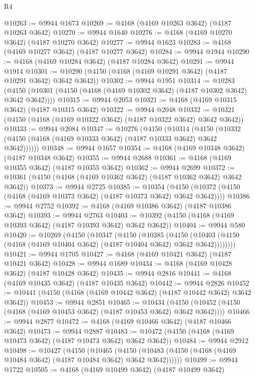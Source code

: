 \begin{lexlean}{R4}
\begin{coremodule}
@10263 := @9944 @1673
@10269 := @4168 (@4169 @10263 @3642) (@4187 @10263 @3642)
@10270 := @9944 @1640
@10276 := @4168 (@4169 @10270 @3642) (@4187 @10270 @3642)
@10277 := @9944 @1623
@10283 := @4168 (@4169 @10277 @3642) (@4187 @10277 @3642)
@10284 := @9944 @1944
@10290 := @4168 (@4169 @10284 @3642) (@4187 @10284 @3642)
@10291 := @9944 @1914
@10301 := @10290 (@4150 (@4168 (@4169 @10291 @3642) (@4187 @10291 @3642) @3642 @3642))
@10302 := @9944 @1951
@10314 := @10283
    (@4150 (@10301 (@4150 (@4168 (@4169 @10302 @3642) (@4187 @10302 @3642) @3642 @3642))))
@10315 := @9944 @2053
@10321 := @4168 (@4169 @10315 @3642) (@4187 @10315 @3642)
@10322 := @9944 @2048
@10332 := @10321 (@4150 (@4168 (@4169 @10322 @3642) (@4187 @10322 @3642) @3642 @3642))
@10333 := @9944 @2084
@10347 := @10276
    (@4150
      (@10314
        (@4150 (@10332 (@4150 (@4168 (@4169 @10333 @3642) (@4187 @10333 @3642) @3642 @3642))))))
@10348 := @9944 @1657
@10354 := @4168 (@4169 @10348 @3642) (@4187 @10348 @3642)
@10355 := @9944 @2688
@10361 := @4168 (@4169 @10355 @3642) (@4187 @10355 @3642)
@10362 := @9944 @2699
@10372 := @10361 (@4150 (@4168 (@4169 @10362 @3642) (@4187 @10362 @3642) @3642 @3642))
@10373 := @9944 @2725
@10385 := @10354
    (@4150 (@10372 (@4150 (@4168 (@4169 @10373 @3642) (@4187 @10373 @3642) @3642 @3642))))
@10386 := @9944 @2752
@10392 := @4168 (@4169 @10386 @3642) (@4187 @10386 @3642)
@10393 := @9944 @2763
@10403 := @10392 (@4150 (@4168 (@4169 @10393 @3642) (@4187 @10393 @3642) @3642 @3642))
@10404 := @9944 @580
@10420 := @10269
    (@4150
      (@10347
        (@4150
          (@10385
            (@4150
              (@10403 (@4150 (@4168 (@4169 @10404 @3642) (@4187 @10404 @3642) @3642 @3642))))))))
@10421 := @9944 @1705
@10427 := @4168 (@4169 @10421 @3642) (@4187 @10421 @3642)
@10428 := @9944 @1689
@10434 := @4168 (@4169 @10428 @3642) (@4187 @10428 @3642)
@10435 := @9944 @2816
@10441 := @4168 (@4169 @10435 @3642) (@4187 @10435 @3642)
@10442 := @9944 @2826
@10452 := @10441 (@4150 (@4168 (@4169 @10442 @3642) (@4187 @10442 @3642) @3642 @3642))
@10453 := @9944 @2851
@10465 := @10434
    (@4150 (@10452 (@4150 (@4168 (@4169 @10453 @3642) (@4187 @10453 @3642) @3642 @3642))))
@10466 := @9944 @2877
@10472 := @4168 (@4169 @10466 @3642) (@4187 @10466 @3642)
@10473 := @9944 @2887
@10483 := @10472 (@4150 (@4168 (@4169 @10473 @3642) (@4187 @10473 @3642) @3642 @3642))
@10484 := @9944 @2912
@10498 := @10427
    (@4150
      (@10465
        (@4150 (@10483 (@4150 (@4168 (@4169 @10484 @3642) (@4187 @10484 @3642) @3642 @3642))))))
@10499 := @9944 @1722
@10505 := @4168 (@4169 @10499 @3642) (@4187 @10499 @3642)

\end{coremodule}
\end{lexlean}

